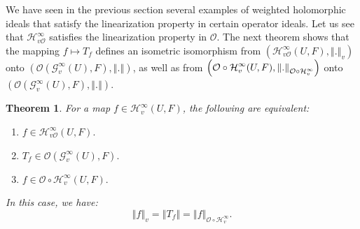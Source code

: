 \documentclass[12pt]{amsart}
\newtheorem{theorem}{Theorem}[section]
\theoremstyle{plain}
\numberwithin{equation}{section}
\begin{document}
We have seen in the previous section several examples of weighted holomorphic ideals that satisfy the
linearization property in certain operator ideals. Let us see that $\mathcal{H}_{v\mathcal{O}}^{\infty }$
 satisfies the linearization property in $\mathcal{O}$. The next theorem shows that  the mapping $f\mapsto T_{f}$ defines an isometric isomorphism
from $\left( \mathcal{H}_{v\mathcal O}^{\infty }(U,F),\left\Vert .\right\Vert
_{v}\right) $ onto $\left( \mathcal{O}(\mathcal{G}_{v}^{\infty
}(U),F),\left\Vert .\right\Vert \right) $, as well as from $\left( \mathcal{%
O\circ H}_{v}^{\infty }(U,F),\left\Vert .\right\Vert _{\mathcal{O\circ H}%
_{v}^{\infty }}\right) $ onto $\left( \mathcal{O}(\mathcal{G}_{v}^{\infty
}(U),F),\left\Vert .\right\Vert \right) .$

\begin{theorem}
\label{5}For a map $f\in \mathcal{H}_{v}^{\infty }(U,F)$, the following are
equivalent:

\begin{enumerate}
\item[(i)] $f\in \mathcal{H}_{v\mathcal{O}}^{\infty }(U,F).$

\item[(ii)] $T_{f}\in \mathcal{O}(\mathcal{G}_{v}^{\infty }(U),F).$

\item[(iii)] $f\in \mathcal{O\circ H}_{v}^{\infty }(U,F).$
\end{enumerate}

In this case, we have: 
\begin{equation*}
\left\Vert f\right\Vert _{v}=\left\Vert T_{f}\right\Vert =\left\Vert
f\right\Vert _{\mathcal{O\circ H}_{v}^{\infty }}.
\end{equation*}%

\end{theorem}
\end{document}
